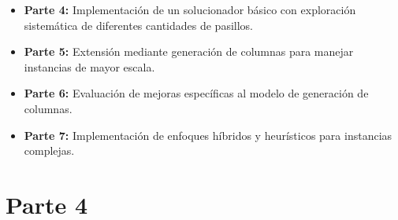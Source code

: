 \documentclass[a4paper,12pt]{article}
\begin{document}
\begin{itemize}
    \item \textbf{Parte 4:} Implementación de un solucionador básico con exploración sistemática de diferentes cantidades de pasillos.
    \item \textbf{Parte 5:} Extensión mediante generación de columnas para manejar instancias de mayor escala.
    \item \textbf{Parte 6:} Evaluación de mejoras específicas al modelo de generación de columnas.
    \item \textbf{Parte 7:} Implementación de enfoques híbridos y heurísticos para instancias complejas.
\end{itemize}

\clearpage

\section{Parte 4}
\end{document}
